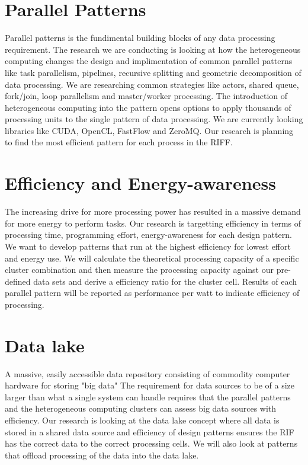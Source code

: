 \documentclass{acm_proc_article-sp}
\begin{document}
\section{Parallel Patterns}
Parallel patterns is the fundimental building blocks of any data processing requirement. The research we are conducting is looking at how the heterogeneous computing changes the design and implimentation of common parallel patterns like task parallelism, pipelines, recursive splitting and geometric decomposition of data processing. We are researching common strategies like actors, shared queue, fork/join, loop parallelism and master/worker processing. The introduction of heterogeneous computing into the pattern opens options to apply thousands of processing units to the single pattern of data processing. We are currently looking libraries like CUDA, OpenCL, FastFlow and ZeroMQ. Our research is planning to find the most efficient pattern for each process in the RIFF.
\section{Efficiency and Energy-awareness}
The increasing drive for more processing power has resulted in a massive demand for more energy to perform tasks. Our research is targetting efficiency in terms of processing time, programming effort, energy-awareness for each design pattern. We want to develop patterns that run at the highest efficiency for lowest effort and energy use. We will calculate the theoretical processing capacity of a specific cluster combination and then measure the processing capacity against our pre-defined data sets and derive a efficiency ratio for the cluster cell. Results of each parallel pattern will be reported as performance per watt to indicate efficiency of processing.
\section{Data lake}
A massive, easily accessible data repository consisting of commodity computer hardware for storing "big data" The requirement for data sources to be of a size larger than what a single system can handle requires that the parallel patterns and the heterogeneous computing clusters can assess big data sources with efficiency. Our research is looking at the data lake concept where all data is stored in a shared data source and efficiency of design patterns ensures the RIF has the correct data to the correct processing cells. We will also look at patterns that offload processing of the data into the data lake.
\end{document}
